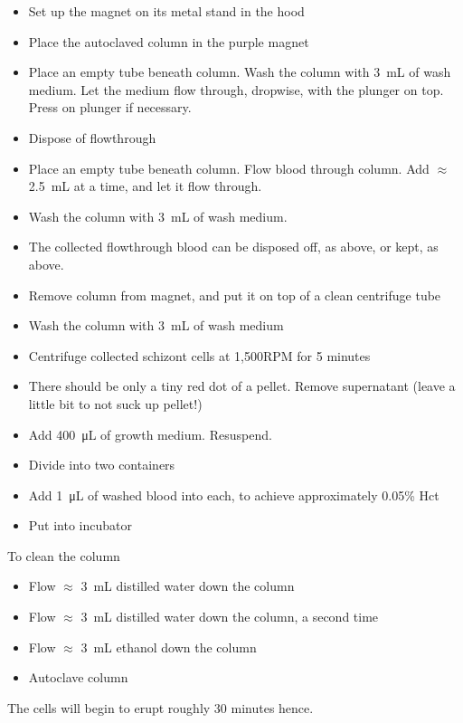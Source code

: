 \documentclass{article}
\begin{document}
\begin{itemize}
	\item Set up the magnet on its metal stand in the hood
	\item Place the autoclaved column in the purple magnet
	\item Place an empty tube beneath column. Wash the column with \SI{3}{mL} of wash medium. Let the medium flow through, dropwise, with the plunger on top. Press on plunger if necessary.
	\item Dispose of flowthrough
	\item Place an empty tube beneath column. Flow blood through column. Add $\approx$ \SI{2.5}{mL} at a time, and let it flow through.
	\item Wash the column with \SI{3}{mL} of wash medium.
	\item The collected flowthrough blood can be disposed off, as above, or kept, as above.
	\item Remove column from magnet, and put it on top of a clean centrifuge tube
	\item Wash the column with \SI{3}{mL} of wash medium
	\item Centrifuge collected schizont cells at 1,500RPM for 5 minutes
	\item There should be only a tiny red dot of a pellet. Remove supernatant (leave a little bit to not suck up pellet!)
	\item Add \SI{400}{\micro\liter} of growth medium. Resuspend.
	\item Divide into two containers
	\item Add \SI{1}{\micro\liter} of washed blood into each, to achieve approximately 0.05\% Hct
	\item Put into incubator
\end{itemize}

To clean the column

\begin{itemize}
	\item Flow $\approx$ \SI{3}{mL} distilled water down the column
	\item Flow $\approx$ \SI{3}{mL} distilled water down the column, a second time
	\item Flow $\approx$ \SI{3}{mL} ethanol down the column
	\item Autoclave column
\end{itemize}

The cells will begin to erupt roughly 30 minutes hence.
\end{document}
